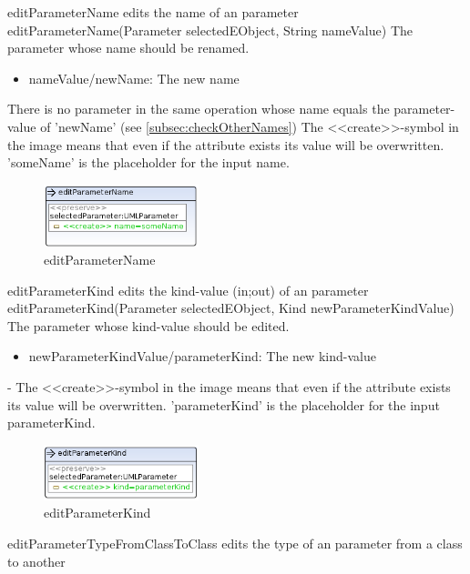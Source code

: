 \op
{editParameterName}
{edits the name of an parameter}
{editParameterName(Parameter selectedEObject, String nameValue)}
{The parameter whose name should be renamed.}
{
\begin{itemize}
 \item nameValue/newName: The new name
\end{itemize}
}
{There is no parameter in the same operation whose name equals the parameter-value of
'newName' (see
\ref{subsec:checkOtherNames})}
{The \textless\textless create\textgreater\textgreater  -symbol in the image
means that even if the attribute exists its value will be overwritten.
'someName' is the placeholder for the input name.}
\begin{figure}[H]
  \centering
  \includegraphics[width=0.4\textwidth]{pics/editParameterName.png}
  \caption{editParameterName}
  \label{editParameterName}
\end{figure}
\op
{editParameterKind}
{edits the kind-value (in;out) of an parameter}
{editParameterKind(Parameter selectedEObject, Kind newParameterKindValue)}
{The parameter whose kind-value should be edited.}
{
\begin{itemize}
 \item newParameterKindValue/parameterKind: The new kind-value
\end{itemize}
}
{-}
{The \textless\textless create\textgreater\textgreater  -symbol in the image
means that even if the attribute exists its value will be overwritten.
'parameterKind' is the placeholder for the input parameterKind.}
\begin{figure}[H]
  \centering
  \includegraphics[width=0.4\textwidth]{pics/editParameterKind.png}
  \caption{editParameterKind}
  \label{editParameterKind}
\end{figure}
\op
{editParameterTypeFromClassToClass}
{edits the type of an parameter from a class to another}
